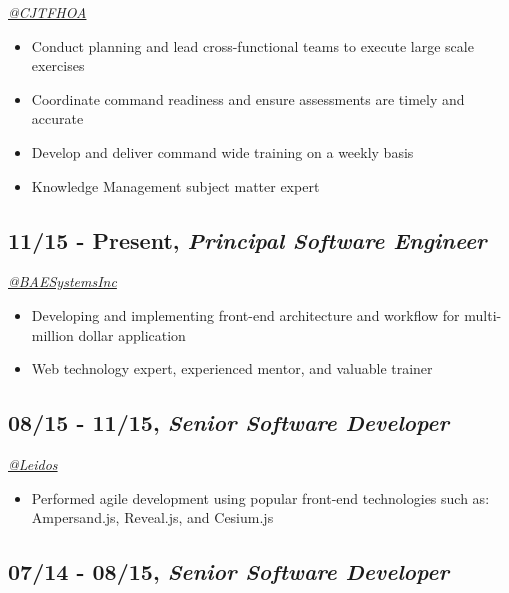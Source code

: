 \documentclass[10pt]{article}
\def\tightlist{}
\begin{document}
\emph{\href{https://twitter.com/CJTFHOA}{@CJTFHOA}}

\begin{itemize}
\tightlist
\item
  Conduct planning and lead cross-functional teams to execute large
  scale exercises
\item
  Coordinate command readiness and ensure assessments are timely and
  accurate
\item
  Develop and deliver command wide training on a weekly basis
\item
  Knowledge Management subject matter expert
\end{itemize}

\subsection{\texorpdfstring{11/15 - Present, \textbf{\emph{Principal
Software
Engineer}}}{11/15 - Present, Principal Software Engineer}}\label{present-principal-software-engineer}

\emph{\href{https://twitter.com/BAESystemsInc}{@BAESystemsInc}}

\begin{itemize}
\tightlist
\item
  Developing and implementing front-end architecture and workflow for
  multi-million dollar application
\item
  Web technology expert, experienced mentor, and valuable trainer
\end{itemize}

\subsection{\texorpdfstring{08/15 - 11/15, \textbf{\emph{Senior Software
Developer}}}{08/15 - 11/15, Senior Software Developer}}\label{senior-software-developer}

\emph{\href{https://twitter.com/LeidosInc}{@Leidos}}

\begin{itemize}
\tightlist
\item
  Performed agile development using popular front-end technologies such
  as: Ampersand.js, Reveal.js, and Cesium.js
\end{itemize}

\subsection{\texorpdfstring{07/14 - 08/15, \textbf{\emph{Senior Software
Developer}}}{07/14 - 08/15, Senior Software Developer}}\label{senior-software-developer-1}
\end{document}
